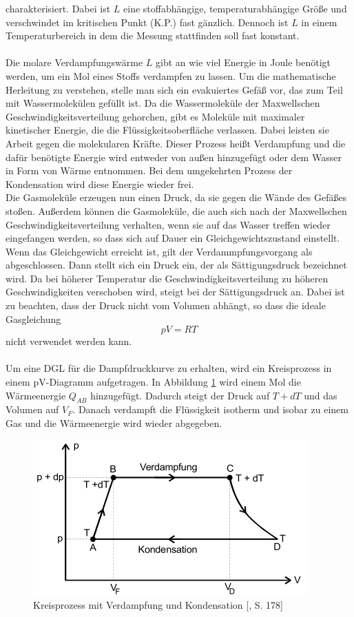 charakterisiert. Dabei ist $L$ eine stoffabhängige, temperaturabhängige Größe und verschwindet im kritischen Punkt (K.P.) fast gänzlich. Dennoch ist $L$ in einem Temperaturbereich 
in dem die Messung stattfinden soll fast konstant.\\
\\
Die molare Verdampfungswärme $L$ gibt an wie viel Energie in Joule benötigt werden, um ein Mol eines Stoffs verdampfen zu lassen. Um die mathematische Herleitung zu verstehen, stelle
man sich ein evakuiertes Gefäß vor, das zum Teil mit Wassermolekülen gefüllt ist. Da die Wassermoleküle der Maxwellschen Geschwindigkeitsverteilung gehorchen, gibt es Moleküle
mit maximaler kinetischer Energie, die die Flüssigkeitsoberfläche verlassen. Dabei leisten sie Arbeit gegen die molekularen Kräfte. Dieser Prozess
heißt Verdampfung und die dafür benötigte Energie wird entweder von außen hinzugefügt oder dem Wasser in Form von Wärme entnommen. Bei dem umgekehrten Prozess der Kondensation wird
diese Energie wieder frei.\\
Die Gasmoleküle erzeugen nun einen Druck, da sie gegen die Wände des Gefäßes stoßen. Außerdem können die Gasmoleküle, die auch sich nach der Maxwellschen
Geschwindigkeitsverteilung verhalten, wenn sie auf das Wasser treffen wieder eingefangen werden, so dass sich auf Dauer ein Gleichgewichtszustand einstellt. 
Wenn das Gleichgewicht erreicht ist, gilt der Verdammpfungsvorgang als abgeschlossen. Dann stellt sich ein Druck ein, der als Sättigungsdruck bezeichnet wird.
Da bei höherer Temperatur die Geschwindigkeitsverteilung zu höheren Geschwindigkeiten verschoben wird, steigt bei der Sättigungsdruck an. Dabei ist zu beachten, dass der Druck nicht
vom Volumen abhängt, so dass die ideale Gasgleichung
\begin{equation}
    \label{eqn:idealeGasgl}
    pV = RT
\end{equation}
nicht verwendet werden kann.
\\
\\
Um eine DGL für die Dampfdruckkurve zu erhalten, wird ein Kreisprozess in einem pV-Diagramm aufgetragen. In Abbildung \ref{fig:kreisprozess} wird einem Mol die Wärmeenergie 
$Q_{AB}$ hinzugefügt. Dadurch steigt der Druck auf $T+dT$ und das Volumen auf $V_F$. Danach verdampft die Flüssigkeit isotherm und isobar zu einem Gas und die Wärmeenergie
wird wieder abgegeben.
\begin{figure}
    \centering
    \includegraphics{Theorie2.png}
    \caption{Kreisprozess mit Verdampfung und Kondensation [\cite{sample}, S. 178]}
    \label{fig:kreisprozess}
\end{figure}

